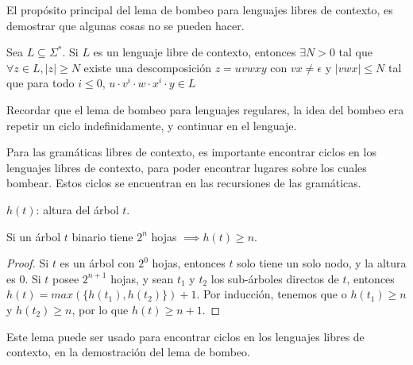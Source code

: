 \documentclass[a4paper,twoside,master.tex]{article}
\begin{document}

El propósito principal del lema de bombeo para lenguajes libres de contexto, es demostrar que algunas cosas no se pueden hacer.

\begin{teorema}
    Sea $L \subseteq \Sigma^{*}$. Si $L$ es un lenguaje libre de contexto, entonces $\exists N > 0$ tal que $\forall z \in L, |z| \ge N$ existe una descomposición $z = u v w x y$ con $vx \neq \epsilon$ y $|vwx| \le N$ tal que para todo $i \le 0$, $u \cdot v^i \cdot w \cdot x^i \cdot y \in L$
\end{teorema}

Recordar que el lema de bombeo para lenguajes regulares, la idea del bombeo era repetir un ciclo indefinidamente, y continuar en el lenguaje.

Para las gramáticas libres de contexto, es importante encontrar ciclos en los lenguajes libres de contexto, para poder encontrar lugares sobre los cuales bombear. Estos ciclos se encuentran en las recursiones de las gramáticas.

\begin{notacion}
    $h(t)$: altura del árbol $t$.
\end{notacion}
\begin{lema}
    Si un árbol $t$ binario tiene $2^n$ hojas $\implies h(t) \ge n$.
\end{lema}
\begin{proof}
    Si $t$ es un árbol con $2^0$ hojas, entonces $t$ solo tiene un solo nodo, y la altura es $0$. Si $t$ posee $2^{n + 1}$ hojas, y sean $t_1$ y $t_2$ los sub-árboles directos de $t$, entonces $h(t) = max(\{h(t_1), h(t_2)\}) + 1$. Por inducción, tenemos que o $h(t_1) \ge n$ y $h(t_2) \ge n$, por lo que $h(t) \ge n + 1$.
\end{proof}

Este lema puede ser usado para encontrar ciclos en los lenguajes libres de contexto, en la demostración del lema de bombeo.
\end{document}
